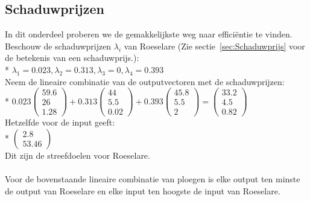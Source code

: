 \documentclass[10pt]{article}
\begin{document}
\subsection{Schaduwprijzen}
In dit onderdeel proberen we de gemakkelijkste weg naar effici\"entie te vinden. Beschouw de schaduwprijzen $\lambda_i$ van Roeselare (Zie sectie~\ref{sec:Schaduwprijs} voor de betekenis van een schaduwprijs.):\\*
$\lambda_1 = 0.023, \lambda_2 = 0.313, \lambda_3 = 0, \lambda_4 = 0.393$\\
Neem de lineaire combinatie van de outputvectoren met de schaduwprijzen:\\*
$0.023\begin{pmatrix}
59.6\\
26\\
1.28
\end{pmatrix} +
0.313\begin{pmatrix}
44\\
5.5\\
0.02
\end{pmatrix} +
0.393\begin{pmatrix}
45.8\\
5.5\\
2
\end{pmatrix} =
\begin{pmatrix}
33.2\\
4.5\\
0.82
\end{pmatrix}$\\
Hetzelfde voor de input geeft:\\*
$\begin{pmatrix}
2.8\\
53.46
\end{pmatrix}$\\
Dit zijn de streefdoelen voor Roeselare.\\\\
Voor de bovenstaande lineaire combinatie van ploegen is elke output ten minste de output van Roeselare en elke input ten hoogste de input van Roeselare.
\end{document}
